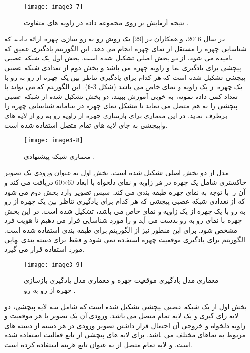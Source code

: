  \begin{figure}[h]
\centering
  \texttt{[image: image3-7]}
  \caption{نتیجه آزمایش بر روی مجموعه داده   در زاویه های متفاوت \cite{ref1}.}
  \label{image2-1}
\end{figure}
\noindent
در سال 2016،  و همکاران در [29] یک روش رو به رو سازی چهره ارائه دادند که شناسایی چهره را مستقل از نمای چهره انجام می دهد. این الگوریتم یادگیری عمیق که  نامیده می شود، از دو بخش اصلی تشکیل شده است. بخش اول یک شبکه عصبی پیچشی برای یادگیری نما و زاویه چهره می باشد و بخش دوم از تعدادی شبکه عصبی پیچشی تشکیل شده است که هر کدام برای یادگیری تناظر  بین یک چهره از رو به رو با یک چهره از یک زاویه و نمای خاص می باشد (شکل 3-6). این الگوریتم که می تواند با تعداد کمی داده نمونه، به خوبی آموزش ببیند، دو بخش تشکیل شده از شبکه عصبی پیچشی را به هم متصل می نماید تا مشکل نمای چهره در سامانه شناسایی چهره را برطرف نماید. در این معماری برای بازسازی چهره از زاویه رو به رو از لایه های واپیچشی  به جای لایه های تمام متصل استفاده شده است.
\begin{figure}[h]
\centering
  \texttt{[image: image3-8]}
  \caption{معماری شبکه پیشنهادی   \cite{ref1}.}
  \label{image2-1}
\end{figure}
\noindent
مدل  از دو بخش اصلی تشکیل شده است. بخش اول به عنوان ورودی یک تصویر خاکستری  شامل یک چهره در هر زاویه و نمای دلخواه با ابعاد 60×60 دریافت می کند و آن را با توجه به نمای چهره طبقه بندی  می کند. سپس تصویر وارد بخش دوم می شود که از تعدادی شبکه عصبی پیچشی که هر کدام برای یادگیری تناظر  بین یک چهره از رو به رو با یک چهره از یک زاویه و نمای خاص می باشد، تشکیل شده است. در این بخش چهره با نمای رو به رو بدست می آید و را مورد شناسایی قرار می دهیم تا هویت فرد مشخص شود. برای این منظور نیز از الگوریتم  برای طبقه بندی استفاده شده است. الگوریتم  برای یادگیری موقعیت چهره استفاده نمی شود و فقط برای دسته بندی نهایی مورد استفاده قرار می گیرد.
 \begin{figure}[h]
\centering
  \texttt{[image: image3-9]}
  \caption{ معماری مدل یادگیری موقعیت چهره و  معماری مدل یادگیری بازسازی چهره از رو به رو \cite{ref1}.}
  \label{image2-1}
\end{figure}
\noindent
بخش اول از یک شبکه عصبی پیچشی تشکیل شده است که شامل سه لایه پیچشی، دو لایه رای گیری و یک لایه تمام متصل می باشد. ورودی آن یک تصویر با هر موقعیت و زاویه دلخواه و خروجی آن احتمال قرار داشتن تصویر ورودی در هر دسته از دسته های مربوط به نماهای مختلف می باشد. برای لایه های پیچشی از تابع فعالیت  استفاده شده است. و لایه تمام متصل از  به عنوان تابع هزینه استفاده کرده است.
